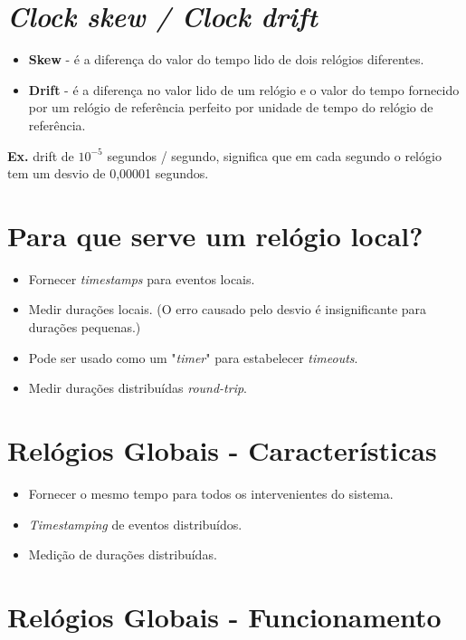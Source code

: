 \documentclass{article}
\begin{document}
\section{\textit{Clock skew / Clock drift}}

\begin{itemize}
    \item \textbf{Skew} - é a diferença do valor do tempo lido de dois relógios diferentes.
    \item \textbf{Drift} - é a diferença no valor lido de um relógio e o valor do tempo fornecido por um relógio de referência perfeito por unidade de tempo do relógio de referência.
\end{itemize}
    \textbf{Ex.} drift de $10^{-5}$ segundos / segundo, significa que em cada segundo o relógio tem um desvio de 0,00001 segundos.
    
\section{Para que serve um \textbf{relógio local}?}

\begin{itemize}
    \item Fornecer \textit{timestamps} para eventos locais.
    \item Medir durações locais. (O erro causado pelo desvio é insignificante para durações pequenas.)
    \item Pode ser usado como um "\textit{timer}" para estabelecer \textit{timeouts}.
    \item Medir durações distribuídas \textit{round-trip}.
\end{itemize}

\section{\textbf{Relógios Globais} - Características}

\begin{itemize}
    \item Fornecer  o mesmo tempo para todos os intervenientes do sistema.
    \item \textit{Timestamping} de eventos distribuídos.
    \item Medição de durações distribuídas.
\end{itemize}

\section{\textbf{Relógios Globais} - Funcionamento}
\end{document}
